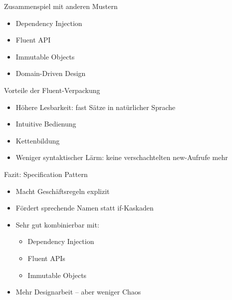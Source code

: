 \begin{frame}{Zusammenspiel mit anderen Mustern}
	\begin{itemize}
	  \item Dependency Injection
	  \item Fluent API
	  \item Immutable Objects
	  \item Domain-Driven Design
	\end{itemize}
\end{frame}

\begin{frame}{Vorteile der Fluent-Verpackung}
	\begin{itemize}
	  \item Höhere Lesbarkeit: fast Sätze in natürlicher Sprache
	  \item Intuitive Bedienung
	  \item Kettenbildung
	  \item Weniger syntaktischer Lärm: keine verschachtelten new-Aufrufe mehr
	\end{itemize}
\end{frame}

\begin{frame}{Fazit: Specification Pattern}
	\begin{itemize}
	  \item Macht Geschäftsregeln explizit
	  \item Fördert sprechende Namen statt if-Kaskaden
	  \item Sehr gut kombinierbar mit:
	  \begin{itemize}
	    \item Dependency Injection
	    \item Fluent APIs
	    \item Immutable Objects
	  \end{itemize}
	  \item Mehr Designarbeit – aber weniger Chaos
	\end{itemize}
\end{frame}
